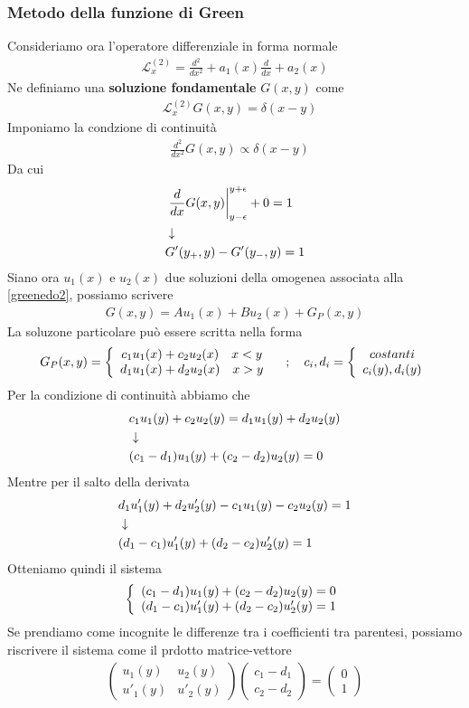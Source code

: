\subsubsection{Metodo della funzione di Green}
Consideriamo ora l'operatore differenziale in forma normale
\begin{align}
	\mathcal{L}_x^{(2)} =\frac{d^2}{dx^2} + a_1(x)\frac{d}{dx} + a_2(x)
\end{align}
Ne definiamo una \textbf{soluzione fondamentale} $G(x,y)$ come
\begin{align}
	&\mathcal{L}_x^{(2)} G(x,y)= \delta(x-y) \label{greenedo2}
\end{align}
Imponiamo la condzione di continuità 
\begin{align}
	&\frac{d^2}{dx^2}G(x,y) \propto \delta(x-y)
\end{align}
Da cui 
\begin{align}
	&\left.\frac{d}{dx}G(x,y) \right|_{y-\epsilon}^{y+\epsilon} + 0 = 1 \\ &\downarrow \nonumber \\
	&G'(y_+,y) - G'(y_-,y) = 1
\end{align}
Siano ora $u_1(x)$ e $u_2(x)$ due soluzioni della omogenea associata alla \ref{greenedo2}, possiamo scrivere
\begin{align}
	G(x,y) = A u_1(x) + B u_2(x) + G_P(x,y)
\end{align}
La soluzone particolare può essere scritta nella forma
\begin{align}
	G_P(x,y) = \left\{ \begin{array}{cc} c_1 u_1 (x) + c_2 u_2 (x) \quad x<y\\ d_1 u_1 (x) + d_2 u_2 (x) \quad x>y \end{array} \right. \quad ; \quad c_i,d_i = \left\{ \begin{array}{cc} costanti\\ c_i(y), d_i(y) \end{array} \right.
\end{align}
Per la condizione di continuità abbiamo che
\begin{align}
	&c_1 u_1 (y) + c_2 u_2 (y) = d_1 u_1 (y) + d_2 u_2 (y)\\ &\downarrow \nonumber \\
	&(c_1 - d_1) u_1 (y) +(c_2 - d_2)u_2 (y) =0
\end{align}
Mentre per il salto della derivata
\begin{align}
	&d_1 u'_1 (y) + d_2 u'_2 (y) - c_1 u_1 (y) - c_2 u_2 (y) = 1 \\ &\downarrow \nonumber \\
	&(d_1 - c_1)u'_1 (y) + (d_2 - c_2)u'_2 (y) = 1 
\end{align}
Otteniamo quindi il sistema
\begin{align}
	\left\{ \begin{array}{cc} (c_1 - d_1) u_1 (y) +(c_2 - d_2)u_2 (y) =0\\ (d_1 - c_1)u'_1 (y) + (d_2 - c_2)u'_2 (y) = 1 \end{array} \right.
\end{align}
Se prendiamo come incognite le differenze tra i coefficienti tra parentesi, possiamo riscrivere il sistema come il prdotto matrice-vettore
\begin{align}
	\begin{pmatrix}
		u_1 (y) & u_2 (y)\\
		u'_1 (y) & u'_2 (y)
	\end{pmatrix} \left( \begin{array}{c}
	c_1 - d_1\\
	c_2 - d_2
\end{array} \right) = \left( \begin{array}{c}
0\\
1
\end{array} \right)
\end{align}
